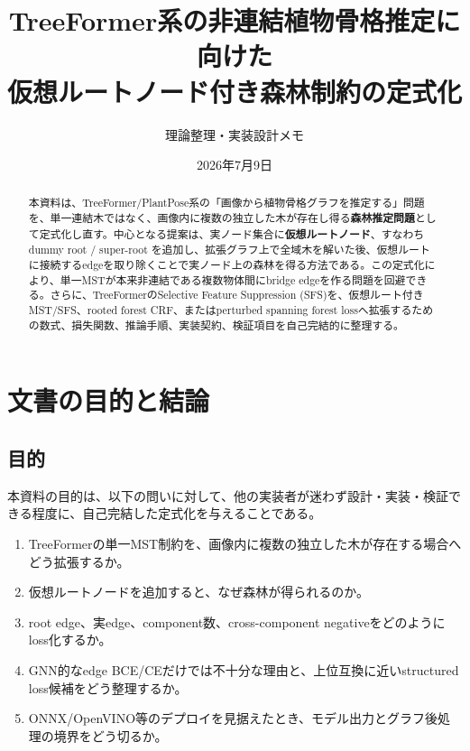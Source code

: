 \documentclass[11pt,a4paper]{article}
\title{TreeFormer系の非連結植物骨格推定に向けた\\仮想ルートノード付き森林制約の定式化}
\author{理論整理・実装設計メモ}
\date{2026年7月9日}
\begin{document}
\maketitle

\begin{abstract}
本資料は、TreeFormer/PlantPose系の「画像から植物骨格グラフを推定する」問題を、単一連結木ではなく、画像内に複数の独立した木が存在し得る\textbf{森林推定問題}として定式化し直す。中心となる提案は、実ノード集合に\textbf{仮想ルートノード}、すなわち dummy root / super-root を追加し、拡張グラフ上で全域木を解いた後、仮想ルートに接続するedgeを取り除くことで実ノード上の森林を得る方法である。この定式化により、単一MSTが本来非連結である複数物体間にbridge edgeを作る問題を回避できる。さらに、TreeFormerのSelective Feature Suppression (SFS)を、仮想ルート付きMST/SFS、rooted forest CRF、またはperturbed spanning forest lossへ拡張するための数式、損失関数、推論手順、実装契約、検証項目を自己完結的に整理する。
\end{abstract}

\tableofcontents
\newpage

\section{文書の目的と結論}
\subsection{目的}
本資料の目的は、以下の問いに対して、他の実装者が迷わず設計・実装・検証できる程度に、自己完結した定式化を与えることである。
\begin{enumerate}
  \item TreeFormerの単一MST制約を、画像内に複数の独立した木が存在する場合へどう拡張するか。
  \item 仮想ルートノードを追加すると、なぜ森林が得られるのか。
  \item root edge、実edge、component数、cross-component negativeをどのようにloss化するか。
  \item GNN的なedge BCE/CEだけでは不十分な理由と、上位互換に近いstructured loss候補をどう整理するか。
  \item ONNX/OpenVINO等のデプロイを見据えたとき、モデル出力とグラフ後処理の境界をどう切るか。
\end{enumerate}
\end{document}

